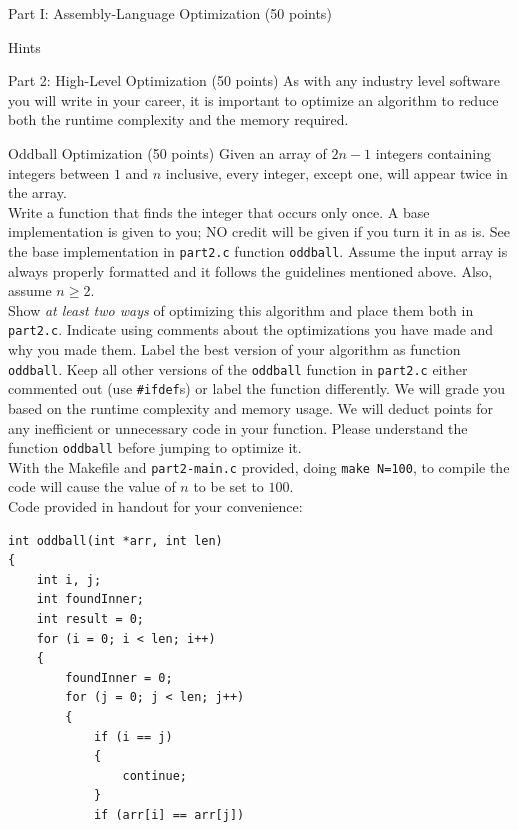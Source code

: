 \documentclass{article}
\newcommand{\asm}[1]{\texttt{#1}}
\begin{document}
\begin{section}{Part I: Assembly-Language Optimization (50 points)}
\begin{subsection}{Hints}
        \end{subsection}
	\end{section}
	\pagebreak
	\begin{section}{Part 2: High-Level Optimization (50 points)}
As with any industry level software you will write in your career, it
is important to optimize an algorithm to reduce both the runtime
complexity and the memory required.  \\
\begin{subsection}{Oddball Optimization (50 points)}
Given an array of $2n-1$ integers containing integers between $1$ and $n$
inclusive, every integer, except one, will appear twice in the
array. \\ \newline
\noindent
Write a function that finds the integer that occurs only
once. A base implementation is given to you; NO credit will be given
if you turn it in as is. See the base implementation in \asm{part2.c}
function \asm{oddball}.  Assume the input array is always properly formatted
and it follows the guidelines mentioned above.  Also, assume $n \ge 2$. \\ \newline
\noindent
Show {\em at least two ways} of optimizing this algorithm and place
them both in \asm{part2.c}. Indicate using comments about the
optimizations you have made and why you made them. Label the best
version of your algorithm as function \asm{oddball}. Keep all other
versions of the \asm{oddball} function in \asm{part2.c} either commented out (use \asm{\#ifdef}s)
or label the function differently.  We will grade you based on the
runtime complexity and memory usage. We will deduct points for any
inefficient or unnecessary code in your function. Please understand the function \asm{oddball} before jumping to optimize it. \\ \newline
\noindent
With the Makefile and \asm{part2-main.c} provided, doing \asm{make N=100},
to compile the code will cause the value of $n$ to be set to $100$. \\
\newline
Code provided in handout for your convenience:
\begin{lstlisting}
int oddball(int *arr, int len)
{
    int i, j;
    int foundInner;
    int result = 0;
    for (i = 0; i < len; i++)
    {
        foundInner = 0;
        for (j = 0; j < len; j++)
        {
            if (i == j)
            {
                continue;
            }
            if (arr[i] == arr[j])

\end{lstlisting}
\end{subsection}
\end{section}
\end{document}
